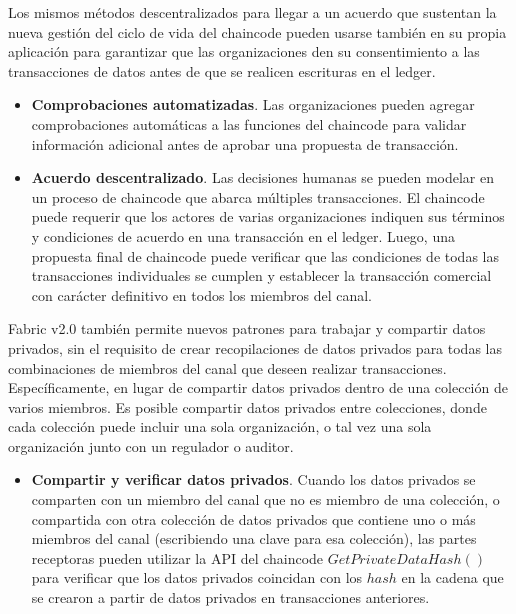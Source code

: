 {Los mismos m\'etodos descentralizados para llegar a un acuerdo que sustentan la nueva gesti\'on del ciclo de vida del chaincode pueden usarse tambi\'en en su propia aplicaci\'on para garantizar que las organizaciones den su consentimiento a las transacciones de datos antes de que se realicen escrituras en el ledger.\\

\begin{itemize}
\item {\bf Comprobaciones automatizadas}. Las organizaciones pueden agregar comprobaciones autom\'aticas a las funciones del chaincode para validar informaci\'on adicional antes de aprobar una propuesta de transacci\'on.

\item {\bf Acuerdo descentralizado}. Las decisiones humanas se pueden modelar en un proceso de chaincode que abarca m\'ultiples transacciones. El chaincode puede requerir que los actores de varias organizaciones indiquen sus t\'erminos y condiciones de acuerdo en una transacci\'on en el ledger. Luego, una propuesta final de chaincode puede verificar que las condiciones de todas las transacciones individuales se cumplen y establecer la transacci\'on comercial con carácter definitivo en todos los miembros del canal.
\end{itemize}

Fabric v2.0 tambi\'en permite nuevos patrones para trabajar y compartir datos privados, sin el requisito de crear recopilaciones de datos privados para todas las combinaciones de miembros del canal que deseen realizar transacciones. Espec\'ificamente, en lugar de compartir datos privados dentro de una colecci\'on de varios miembros. Es posible compartir datos privados entre colecciones, donde cada colecci\'on puede incluir una sola organizaci\'on, o tal vez una sola organizaci\'on junto con un regulador o auditor.\\

\begin{itemize}
\item {\bf Compartir y verificar datos privados}. Cuando los datos privados se comparten con un miembro del canal que no es miembro de una colecci\'on, o compartida con otra colecci\'on de datos privados que contiene uno o m\'as miembros del canal (escribiendo una clave para esa colecci\'on), las partes receptoras pueden utilizar la API del chaincode $GetPrivateDataHash()$ para verificar que los datos privados coincidan con los $hash$ en la cadena que se crearon a partir de datos privados en transacciones anteriores.


\end{itemize}}
